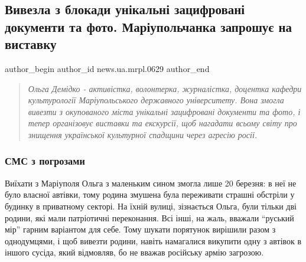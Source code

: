  
 
 
 
 
 
\subsection{Вивезла з блокади унікальні зацифровані документи та фото. Маріупольчанка запрошує на виставку}
\label{sec:06_07_2023.stz.news.ua.mrpl.0629.1.mariupolchanka_zaproshuje_na_vystavku}
 
\ifcmt
 author_begin
   author_id news.ua.mrpl.0629
 author_end
\fi

\begin{quote}
\em Ольга Демідко - активістка, волонтерка, журналістка, доцентка кафедри
культурології Маріупольського державного університету. Вона змогла вивезти з
окупованого міста унікальні зацифровані документи та фото, і тепер організовує
виставки та екскурсії, щоб нагадати всьому світу про знищення української
культурної спадщини через агресію росії.
\end{quote}

\subsubsection{СМС з погрозами}

Виїхати з Маріуполя Ольга з маленьким сином змогла лише 20 березня: в неї не
було власної автівки, тому родина змушена була переживати страшні обстріли у
будинку в приватному секторі. На їхній вулиці, зізнається Ольга, були тільки
дві родини, які мали патріотичні переконання. Всі інші, на жаль, вважали
\enquote{руський мір} гарним варіантом для себе. Тому шукати порятунок вирішили разом з
однодумцями, і щоб вивезти родини, навіть намагалися викупити одну з автівок в
іншого сусіда, який відмовляв, бо не вважав російську армію загрозою.


